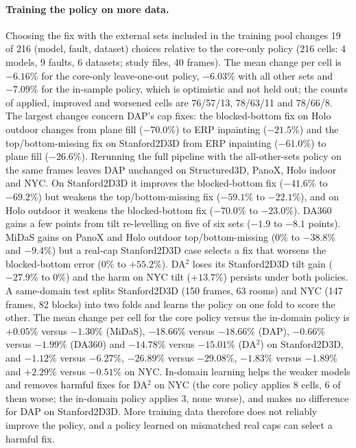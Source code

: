 \documentclass{article}
\begin{document}
\paragraph{Training the policy on more data.} Choosing the fix with the external sets included in the training pool changes 19 of 216 (model, fault, dataset) choices relative to the core-only policy (216 cells: 4 models, 9 faults, 6 datasets; study files, 40 frames). The mean change per cell is $-6.16\%$ for the core-only leave-one-out policy, $-6.03\%$ with all other sets and $-7.09\%$ for the in-sample policy, which is optimistic and not held out; the counts of applied, improved and worsened cells are 76/57/13, 78/63/11 and 78/66/8. The largest changes concern DAP's cap fixes: the blocked-bottom fix on Holo outdoor changes from plane fill ($-70.0\%$) to ERP inpainting ($-21.5\%$) and the top/bottom-missing fix on Stanford2D3D from ERP inpainting ($-61.0\%$) to plane fill ($-26.6\%$). Rerunning the full pipeline with the all-other-sets policy on the same frames leaves DAP unchanged on Structured3D, PanoX, Holo indoor and NYC. On Stanford2D3D it improves the blocked-bottom fix ($-41.6\%$ to $-69.2\%$) but weakens the top/bottom-missing fix ($-59.1\%$ to $-22.1\%$), and on Holo outdoor it weakens the blocked-bottom fix ($-70.0\%$ to $-23.0\%$). DA360 gains a few points from tilt re-levelling on five of six sets ($-1.9$ to $-8.1$ points). MiDaS gains on PanoX and Holo outdoor top/bottom-missing ($0\%$ to $-38.8\%$ and $-9.4\%$) but a real-cap Stanford2D3D case selects a fix that worsens the blocked-bottom error ($0\%$ to $+55.2\%$). DA$^2$ loses its Stanford2D3D tilt gain ($-27.9\%$ to $0\%$) and the harm on NYC tilt ($+13.7\%$) persists under both policies. A same-domain test splits Stanford2D3D (150 frames, 63 rooms) and NYC (147 frames, 82 blocks) into two folds and learns the policy on one fold to score the other. The mean change per cell for the core policy versus the in-domain policy is $+0.05\%$ versus $-1.30\%$ (MiDaS), $-18.66\%$ versus $-18.66\%$ (DAP), $-0.66\%$ versus $-1.99\%$ (DA360) and $-14.78\%$ versus $-15.01\%$ (DA$^2$) on Stanford2D3D, and $-1.12\%$ versus $-6.27\%$, $-26.89\%$ versus $-29.08\%$, $-1.83\%$ versus $-1.89\%$ and $+2.29\%$ versus $-0.51\%$ on NYC. In-domain learning helps the weaker models and removes harmful fixes for DA$^2$ on NYC (the core policy applies 8 cells, 6 of them worse; the in-domain policy applies 3, none worse), and makes no difference for DAP on Stanford2D3D. More training data therefore does not reliably improve the policy, and a policy learned on mismatched real caps can select a harmful fix.
\end{document}
